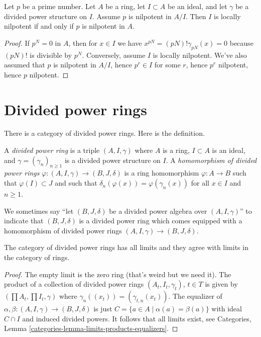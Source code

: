\begin{lemma}
\label{lemma-nil}
Let $p$ be a prime number. Let $A$ be a ring, let $I \subset A$ be an ideal,
and let $\gamma$ be a divided power structure on $I$. Assume $p$ is nilpotent
in $A/I$. Then $I$ is locally nilpotent if and only if $p$ is nilpotent in $A$.
\end{lemma}

\begin{proof}
If $p^N = 0$ in $A$, then for $x \in I$ we have
$x^{pN} = (pN)!\gamma_{pN}(x) = 0$ because $(pN)!$ is
divisible by $p^N$. Conversely, assume $I$ is locally nilpotent.
We've also assumed that $p$ is nilpotent in $A/I$, hence
$p^r \in I$ for some $r$, hence $p^r$ nilpotent, hence $p$ nilpotent.
\end{proof}








\section{Divided power rings}
\label{section-divided-power-rings}

\noindent
There is a category of divided power rings.
Here is the definition.

\begin{definition}
\label{definition-divided-power-ring}
A {\it divided power ring} is a triple $(A, I, \gamma)$ where
$A$ is a ring, $I \subset A$ is an ideal, and $\gamma = (\gamma_n)_{n \geq 1}$
is a divided power structure on $I$.
A {\it homomorphism of divided power rings}
$\varphi : (A, I, \gamma) \to (B, J, \delta)$ is a ring homomorphism
$\varphi : A \to B$ such that $\varphi(I) \subset J$ and such that
$\delta_n(\varphi(x)) = \varphi(\gamma_n(x))$ for all $x \in I$ and
$n \geq 1$.
\end{definition}

\noindent
We sometimes say ``let $(B, J, \delta)$ be a divided power algebra over
$(A, I, \gamma)$'' to indicate that $(B, J, \delta)$ is a divided power ring
which comes equipped with a homomorphism of divided power rings
$(A, I, \gamma) \to (B, J, \delta)$.

\begin{lemma}
\label{lemma-limits}
The category of divided power rings has all limits and they agree with
limits in the category of rings.
\end{lemma}

\begin{proof}
The empty limit is the zero ring (that's weird but we need it).
The product of a collection of divided power rings $(A_t, I_t, \gamma_t)$,
$t \in T$ is given by $(\prod A_t, \prod I_t, \gamma)$ where
$\gamma_n((x_t)) = (\gamma_{t, n}(x_t))$.
The equalizer of $\alpha, \beta : (A, I, \gamma) \to (B, J, \delta)$
is just $C = \{a \in A \mid \alpha(a) = \beta(a)\}$ with ideal $C \cap I$
and induced divided powers. It follows that all limits exist, see
Categories, Lemma \ref{categories-lemma-limits-products-equalizers}.
\end{proof}

